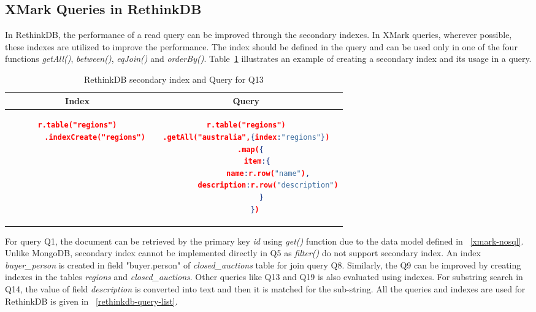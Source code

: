 \subsection{XMark Queries in RethinkDB}
In RethinkDB, the performance of a read query can be improved through the secondary indexes. In XMark queries,  wherever possible, these indexes are utilized to improve the performance. The index should be defined in the query and can be used only in one of the four functions \textit{getAll()}, \textit{between()}, \textit{eqJoin()} and \textit{orderBy()}. Table~\ref{tbl:rethinkdb-index-query} illustrates an example of creating a secondary index and its usage in a query.
\begin{longtable}{c|c}
	\caption{ RethinkDB secondary index and Query for Q13}
	\label{tbl:rethinkdb-index-query}\\
    {Index} & {Query}\\
	\hline
\begin{minipage}{.3\textwidth}
\begin{lstlisting}[language=JSON,basicstyle=\scriptsize]
    r.table("regions")
        .indexCreate("regions")
\end{lstlisting}
\end{minipage} &
\begin{minipage}{.5\textwidth}
\begin{lstlisting}[language=JSON,basicstyle=\scriptsize]
r.table("regions")
.getAll("australia",{index:"regions"})
    .map({  
       item:{  
          name:r.row("name"),
          description:r.row("description")
       }
    })
\end{lstlisting}
\end{minipage}
\end{longtable}

For query Q1, the document can be retrieved by the primary key \textit{id} using \textit{get()} function due to the data model defined in ~\ref{xmark-nosql}. Unlike MongoDB, secondary index cannot be implemented directly in Q5 as \textit{filter()} do not support secondary index. An index \textit{buyer\_person} is created in field "buyer.person" of \textit{closed\_auctions} table for join query Q8. Similarly, the Q9 can be improved by creating indexes in the tables \textit{regions} and \textit{closed\_auctions}. Other queries like Q13 and Q19 is also evaluated using indexes. For substring search in Q14, the value of  field \textit{description} is converted into text and then it is matched for the sub-string. All the queries and indexes are used for RethinkDB is given in ~\ref{rethinkdb-query-list}.
